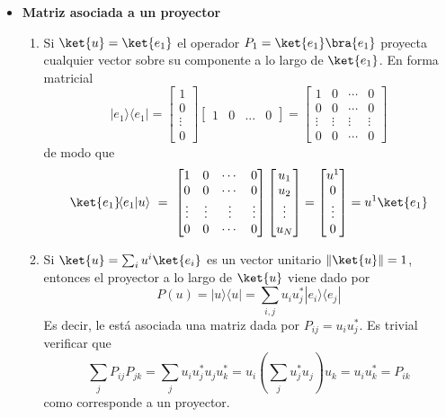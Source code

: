 \documentclass[a4paper,11pt]{book} %
\numberwithin{equation}{chapter}
\newcommand{\braket}[2]{\langle #1|#2\rangle}
\newcommand{\ketbra}[2]{| #1\rangle \! \langle #2|}
\begin{document}
\begin{itemize}

	\item \textbf{Matriz asociada a un proyector}

\begin{enumerate}

	\item Si $\ket{u} = \ket{e_1}$ el operador $P_1 = \ket{e_1}\bra{e_1}$ proyecta cualquier vector sobre su componente a lo largo de $\ket{e_1}$.    En forma matricial
 $$
\ketbra{e_1}{e_1} = \begin{bmatrix} 1 \\ 0 \\ \vdots\\ 0 \end{bmatrix} \begin{bmatrix} 1 & 0 & ...& 0 \end{bmatrix}  =
 \begin{bmatrix} 1 & 0 &  \cdots & 0 \\ 0 & 0  & \cdots & 0 \\ 
 \vdots & \vdots &\vdots & \vdots  \\
 0  & 0 & \cdots & 0\end{bmatrix}
 $$
de modo que
$$
    \ket{e_1} \! \braket{e_1}{u} ~= ~\begin{bmatrix} 1 & 0 &  \cdots & 0 \\ 0 & 0  & \cdots & 0 \\ 
 \vdots & \vdots &\vdots & \vdots  \\
 0  & 0 & \cdots & 0\end{bmatrix} \begin{bmatrix} u_1 \\ u_2 \\ \vdots \\ u_N \end{bmatrix}
 = \begin{bmatrix} u^1 \\ 0 \\ \vdots \\ 0 \end{bmatrix} = u^1 \ket{e_1}
$$

	\item Si $\ket{u} = \sum_i u^i\ket{e_i}$ es un vector unitario  $\|\ket{u}\|=1$, entonces el proyector a lo largo de $\ket{u}$ viene dado por
	\begin{equation}
	\boxed{P(u) = \ketbra{u}{u} = \sum_{i,j} u_i u^*_j \ketbra{e_i}{e_j}}
	\end{equation}
Es decir, le está asociada una matriz dada por $P_{ij}=u_iu^*_j$. Es trivial verificar que 
$$
\sum_j P_{ij}P_{jk} = \sum_j u_i u^*_j u_j u^*_k = u_i\left(\sum_j u^*_j u_j\right) u_k = u_i u_k^* = P_{ik}
$$
como corresponde a un proyector.
\end{enumerate}		



\end{itemize}
\end{document}
